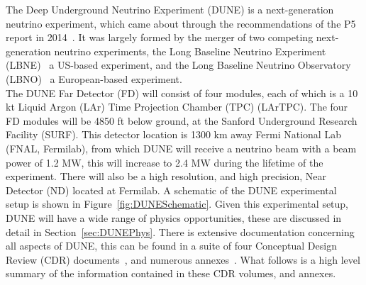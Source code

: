 The Deep Underground Neutrino Experiment (DUNE) is a next-generation neutrino experiment, which came about through the recommendations of the P5 report in 2014~\citep{P5Doc}. It was largely formed by the merger of two competing next-generation neutrino experiments, the Long Baseline Neutrino Experiment (LBNE)~\citep{LBNE_CDR1, LBNE_CDR2, LBNE_CDR3, LBNE_CDR4, LBNE_CDR5, LBNE_CDR6} a US-based experiment, and the Long Baseline Neutrino Observatory (LBNO)~\citep{LBNO_EOI} a European-based experiment. \\

The DUNE Far Detector (FD) will consist of four modules, each of which is a 10 kt Liquid Argon (LAr) Time Projection Chamber (TPC) (LArTPC). The four FD modules will be 4850 ft below ground, at the Sanford Underground Research Facility (SURF). This detector location is 1300 km away Fermi National Lab (FNAL, Fermilab), from which DUNE will receive a neutrino beam with a beam power of 1.2 MW, this will increase to 2.4 MW during the lifetime of the experiment. There will also be a high resolution, and high precision, Near Detector (ND) located at Fermilab. A schematic of the DUNE experimental setup is shown in Figure~\ref{fig:DUNESchematic}. Given this experimental setup, DUNE will have a wide range of physics opportunities, these are discussed in detail in Section~\ref{sec:DUNEPhys}. There is extensive documentation concerning all aspects of DUNE, this can be found in a suite of four Conceptual Design Review (CDR) documents~\citep{DUNECDR_V1, DUNECDR_V2, DUNECDR_V3, DUNECDR_V4}, and numerous annexes~\citep{DUNEAtWork}. What follows is a high level summary of the information contained in these CDR volumes, and annexes. \\ 

